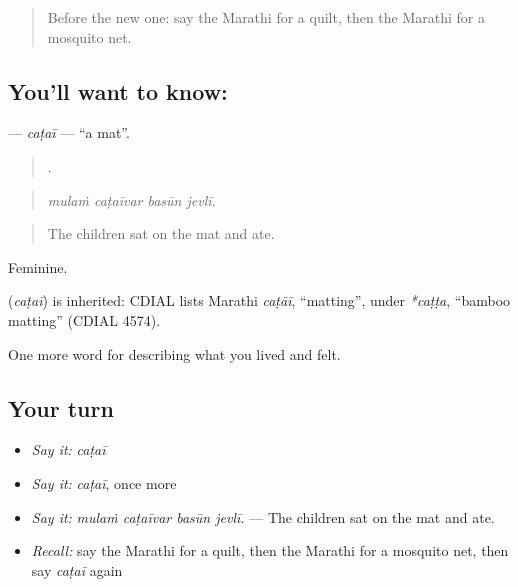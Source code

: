 \label{lesson:MR-C523-catai}



\begin{quote}
Before the new one: say the Marathi for a quilt, then the Marathi for a mosquito net.
\end{quote}

\subsection*{You'll want to know: }
\textbf{} — \emph{caṭaī} — \textquotedblleft{}a mat\textquotedblright{}.

\begin{quote}
   .
\end{quote}

\begin{quote}
\emph{mulaṁ caṭaīvar basūn jevlī.}
\end{quote}

\begin{quote}
The children sat on the mat and ate.
\end{quote}

Feminine.

\begin{cousinweb}
\textbf{} (\emph{caṭaī}) is inherited: CDIAL lists Marathi \emph{caṭāī}, \textquotedblleft{}matting\textquotedblright{}, under \emph{*caṭṭa}, \textquotedblleft{}bamboo matting\textquotedblright{} (CDIAL 4574).
\end{cousinweb}

\begin{grammarlens}[title={What you've built}]
One more word for describing what you lived and felt.
\end{grammarlens}

\subsection*{Your turn}
\begin{itemize}
\raggedright
  \item \emph{Say it:} \emph{caṭaī}
  \item \emph{Say it:} \emph{caṭaī}, once more
  \item \emph{Say it:} \emph{mulaṁ caṭaīvar basūn jevlī.} — The children sat on the mat and ate.
  \item \emph{Recall:} say the Marathi for a quilt, then the Marathi for a mosquito net, then say \emph{caṭaī} again
\end{itemize}

